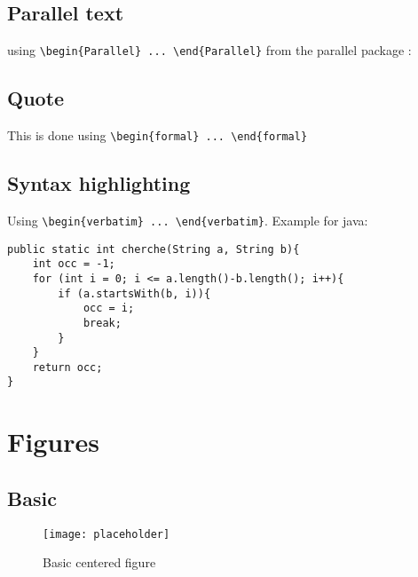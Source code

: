 \documentclass{customSynthesis}
\begin{document}
\subsection*{Parallel text}

using \verb|\begin{Parallel} ... \end{Parallel}| from the parallel package :

\begin{Parallel}[v]{0.48\textwidth}{0.48\textwidth}

\ParallelPar
\end{Parallel}

\subsection*{Quote}

\begin{formal}
This is done using \verb|\begin{formal} ... \end{formal}|
\end{formal}

\subsection*{Syntax highlighting}

Using \verb|\begin{verbatim} ... \end{verbatim}|. Example for java:

\begin{verbatim}
public static int cherche(String a, String b){
    int occ = -1;
    for (int i = 0; i <= a.length()-b.length(); i++){
        if (a.startsWith(b, i)){
            occ = i;
            break;
        }
    }
    return occ;
}
\end{verbatim}

\section*{Figures}

\subsection*{Basic}

\begin{figure}[H]
    \centering
    \texttt{[image: placeholder]}
    \caption{Basic centered figure}
\end{figure}
\end{document}

